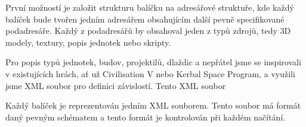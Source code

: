 První možností je založit strukturu balíčku na adresářové struktuře, kde každý balíček bude tvořen jedním adresářem obsahujícím další pevně specifikované podadresáře. Každý z podadresářů by obsahoval jeden z typů zdrojů, tedy 3D modely, textury, popis jednotek nebo skripty.

Pro popis typů jednotek, budov, projektilů, dlaždic a nepřátel jsme se inspirovali v existujících hrách, ať už Civilisation V nebo Kerbal Space Program, a využili jsme XML soubor pro definici závislostí. Tento XML soubor 
 
Každý balíček je reprezentován jedním XML souborem. Tento soubor má formát daný pevným schématem a tento formát je kontrolován při každém načítání. 